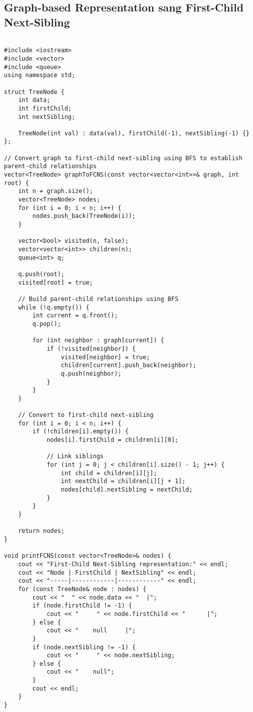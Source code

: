 \documentclass[12pt]{article}
\begin{document}
\subsection{Graph-based Representation sang First-Child Next-Sibling}

\begin{lstlisting}[caption={Chuyển đổi từ Graph-based Representation sang First-Child Next-Sibling}]

#include <iostream>
#include <vector>
#include <queue>
using namespace std;

struct TreeNode {
    int data;
    int firstChild;
    int nextSibling;
    
    TreeNode(int val) : data(val), firstChild(-1), nextSibling(-1) {}
};

// Convert graph to first-child next-sibling using BFS to establish parent-child relationships
vector<TreeNode> graphToFCNS(const vector<vector<int>>& graph, int root) {
    int n = graph.size();
    vector<TreeNode> nodes;
    for (int i = 0; i < n; i++) {
        nodes.push_back(TreeNode(i));
    }
    
    vector<bool> visited(n, false);
    vector<vector<int>> children(n);
    queue<int> q;
    
    q.push(root);
    visited[root] = true;
    
    // Build parent-child relationships using BFS
    while (!q.empty()) {
        int current = q.front();
        q.pop();
        
        for (int neighbor : graph[current]) {
            if (!visited[neighbor]) {
                visited[neighbor] = true;
                children[current].push_back(neighbor);
                q.push(neighbor);
            }
        }
    }
    
    // Convert to first-child next-sibling
    for (int i = 0; i < n; i++) {
        if (!children[i].empty()) {
            nodes[i].firstChild = children[i][0];
            
            // Link siblings
            for (int j = 0; j < children[i].size() - 1; j++) {
                int child = children[i][j];
                int nextChild = children[i][j + 1];
                nodes[child].nextSibling = nextChild;
            }
        }
    }
    
    return nodes;
}

void printFCNS(const vector<TreeNode>& nodes) {
    cout << "First-Child Next-Sibling representation:" << endl;
    cout << "Node | FirstChild | NextSibling" << endl;
    cout << "-----|------------|------------" << endl;
    for (const TreeNode& node : nodes) {
        cout << "  " << node.data << "  |";
        if (node.firstChild != -1) {
            cout << "     " << node.firstChild << "      |";
        } else {
            cout << "    null     |";
        }
        if (node.nextSibling != -1) {
            cout << "     " << node.nextSibling;
        } else {
            cout << "    null";
        }
        cout << endl;
    }
}


\end{lstlisting}
\end{document}

